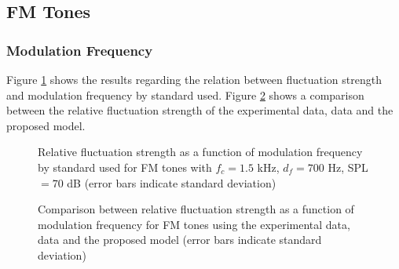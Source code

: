 \documentclass[a4paper]{article}
\begin{document}
\subsection{FM Tones}

\subsubsection{Modulation Frequency}

Figure \ref{fig:fmstds} shows the results regarding the relation between
fluctuation strength and modulation frequency by standard used. Figure
\ref{fig:fmcomp} shows a comparison between the relative fluctuation strength
of the experimental data, \citeauthor{Fastl2007Psychoacoustics} data and the
proposed model.

\begin{figure}[ht]
    \centering
    \resizebox{!}{10cm}{
        
    }
    \caption{Relative fluctuation strength as a function of modulation
        frequency by standard used for FM tones with $f_c = 1.5$ kHz,
        $d_f = 700$ Hz, SPL $= 70$ dB (error bars indicate standard deviation)}
    \label{fig:fmstds}
\end{figure}

\begin{figure}[ht]
    \centering
    \resizebox{!}{10cm}{
        
    }
    \caption{Comparison between relative fluctuation strength as a function of
        modulation frequency for FM tones using the experimental data,
        \citeauthor{Fastl2007Psychoacoustics} data and the proposed model
        (error bars indicate standard deviation)}
    \label{fig:fmcomp}
\end{figure}

\custombibliography
\end{document}
